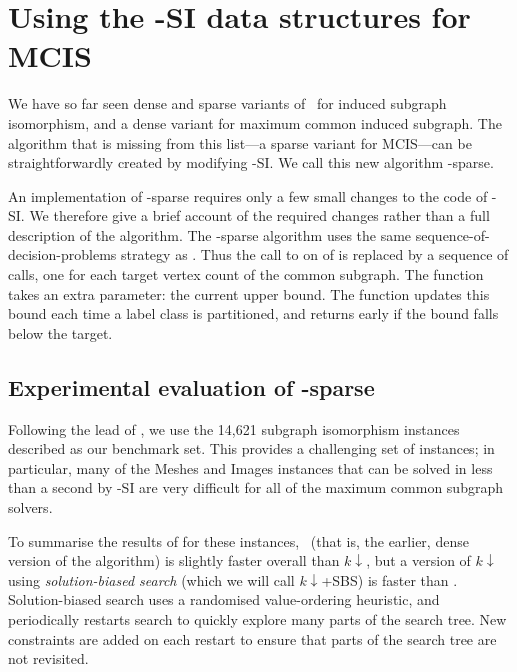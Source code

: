 \FloatBarrier

\section{Using the \McSplit-SI data structures for MCIS}\label{sec:mcsplit-sparse}

We have so far seen dense and sparse variants of \McSplit\ for induced subgraph isomorphism, and
a dense variant for maximum common induced subgraph.  The algorithm that is missing from this
list---a sparse variant for MCIS---can be straightforwardly created by modifying \McSplit-SI. 
We call this new algorithm \McSplit-sparse.

An implementation of \McSplit-sparse
requires only a few small changes to the code of \McSplit-SI. We
therefore give a brief account of the required changes rather than a full
description of the algorithm.  The \McSplit-sparse algorithm uses the same
sequence-of-decision-problems strategy as \McSplitDown. Thus the call to
 on  of 
is replaced by a sequence of calls, one for each target
vertex count of the common
subgraph.  The  function takes an extra parameter: the current
upper bound. The  function updates this bound each time a label
class is partitioned, and returns early if the bound falls below the target.

\subsection{Experimental evaluation of \McSplit-sparse}

Following the lead of \cite{DBLP:conf/cpaior/ArchibaldDHMP019},
we use the 14,621 subgraph isomorphism instances described
 as our benchmark set.
This provides a challenging set of instances; in particular,
many of the Meshes and Images instances that can be solved in less
than a second by \McSplit-SI are very difficult for all of the maximum
common subgraph solvers.

To summarise the results of \cite{DBLP:conf/cpaior/ArchibaldDHMP019}
for these instances, \McSplitDown\ (that is, the earlier, dense version
of the algorithm) is slightly faster overall than
$k\downarrow$, but a version of $k\downarrow$ using \emph{solution-biased
search} (which we will call $k\downarrow$+SBS) is faster than
\McSplitDown.  Solution-biased search uses a randomised value-ordering
heuristic, and periodically restarts search to quickly
explore many parts of the search tree.  New constraints are added
on each restart to ensure that parts of the search tree are not
revisited.

